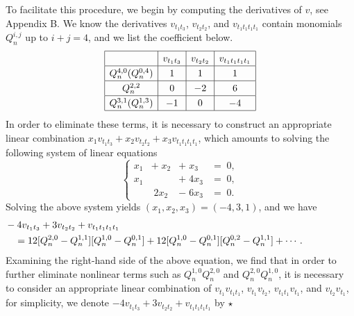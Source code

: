 \documentclass[11p,reqno]{amsart}
\numberwithin{equation}{section}
\numberwithin{equation}{section}
\begin{document}
To facilitate this procedure, we begin by computing the derivatives of $v$, see Appendix B. 
We know the derivatives $v_{t_1t_3}$, $v_{t_2t_2}$, and $v_{t_1t_1t_1t_1}$ contain monomials $Q_n^{i, j}$ up to $i+j=4$, and we list the coefficient below. 
\begin{equation} \nonumber
    \renewcommand{\arraystretch}{1.25}
    \begin{array}{|c|c|c|c|}
        \hline
         & v_{t_1t_3} & v_{t_2t_2} & v_{t_1t_1t_1t_1} \\ \hline
        Q_n^{4, 0}(Q_n^{0, 4}) & 1 & 1 & 1 \\ \hline
        Q_n^{2, 2} & 0 & -2 & 6 \\ \hline
        Q_n^{3, 1}(Q_n^{1, 3}) & -1 & 0 & -4 \\ \hline
    \end{array}
\end{equation}
In order to eliminate these terms, it is necessary to construct an appropriate linear combination $x_1v_{t_1t_3}+x_2v_{t_2t_2}+x_3v_{t_1t_1t_1t_1}$, which amounts to solving the following system of linear equations
\begin{equation} \nonumber
\left\{
\begin{array}{rrrrrl}
x_1 & +\; x_2 & +\;  x_3 & =\; 0, \\
x_1 & \;   & +\; 4x_3 & =\; 0, \\
& \; 2x_2 & -\;  6x_3 & =\; 0.
\end{array}
\right.
\end{equation} 
Solving the above system yields $(x_1,x_2,x_3)=(-4,3,1)$, and we have
\begin{align} \hspace{-2cm} \label{part_1}
\begin{aligned}
   & -4v_{t_1t_3} + 3v_{t_2t_2} + v_{t_1t_1t_1t_1} \\
    &\quad= 12[Q_n^{2, 0} - Q_n^{1, 1}][Q_n^{1, 0} - Q_n^{0, 1}] + 12[Q_n^{1, 0} - Q_n^{0, 1}][Q_n^{0, 2} - Q_n^{1, 1}] + \cdots.
    \end{aligned}
\end{align}
Examining the right-hand side of the above equation, we find that in order to further eliminate nonlinear terms such as $Q_n^{1, 0}Q_n^{2, 0}$ and $Q_n^{2, 0}Q_n^{1, 0}$, it is necessary to consider an appropriate linear combination of $v_{t_1} v_{t_1t_1}$, $v_{t_1} v_{t_2}$, $v_{t_1t_1} v_{t_1}$, and $v_{t_2} v_{t_1}$, for simplicity, we denote $-4v_{t_1t_3} + 3v_{t_2t_2} + v_{t_1t_1t_1t_1}$ by $\star$
\end{document}
